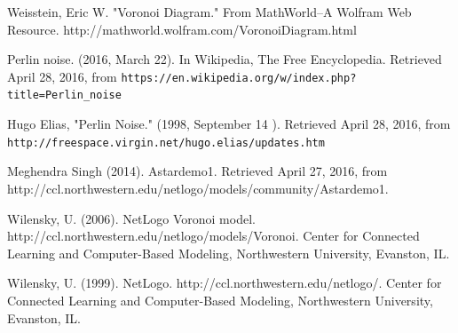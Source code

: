 \documentclass[conference]{IEEEtran}
\begin{document}

%
%
%
\begin{thebibliography}{1}
Weisstein, Eric W. "Voronoi Diagram." From MathWorld--A Wolfram Web Resource. http://mathworld.wolfram.com/VoronoiDiagram.html

Perlin noise. (2016, March 22). In Wikipedia, The Free Encyclopedia. Retrieved  April 28, 2016, from \verb+https://en.wikipedia.org/w/index.php?title=Perlin_noise+

Hugo Elias, "Perlin Noise." (1998, September 14 ). Retrieved April 28, 2016, from \verb+http://freespace.virgin.net/hugo.elias/updates.htm+

Meghendra Singh (2014). Astardemo1. Retrieved April 27, 2016, from http://ccl.northwestern.edu/netlogo/models/community/Astardemo1.

Wilensky, U. (2006). NetLogo Voronoi model. http://ccl.northwestern.edu/netlogo/models/Voronoi. Center for Connected Learning and Computer-Based Modeling, Northwestern University, Evanston, IL.

Wilensky, U. (1999). NetLogo. http://ccl.northwestern.edu/netlogo/. Center for Connected Learning and Computer-Based Modeling, Northwestern University, Evanston, IL.

\end{thebibliography}

\end{document}

